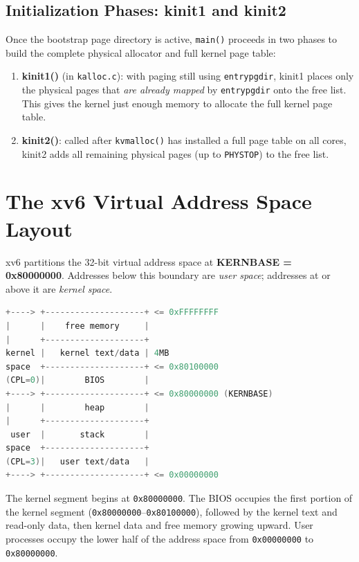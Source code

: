 \documentclass[11pt]{article}
\begin{document}
\subsection{Initialization Phases: kinit1 and kinit2}

Once the bootstrap page directory is active, \texttt{main()} proceeds in two phases to build the complete physical allocator and full kernel page table:

\begin{enumerate}
    \item \textbf{kinit1()} (in \texttt{kalloc.c}): with paging still using \texttt{entrypgdir}, kinit1 places only the physical pages that \emph{are already mapped} by \texttt{entrypgdir} onto the free list. This gives the kernel just enough memory to allocate the full kernel page table.
    \item \textbf{kinit2()}: called after \texttt{kvmalloc()} has installed a full page table on all cores, kinit2 adds all remaining physical pages (up to \texttt{PHYSTOP}) to the free list.
\end{enumerate}

\section{The xv6 Virtual Address Space Layout}

xv6 partitions the 32-bit virtual address space at \textbf{KERNBASE = 0x80000000}. Addresses below this boundary are \emph{user space}; addresses at or above it are \emph{kernel space}.

\begin{lstlisting}[language=C, caption={xv6 virtual address space layout}]
+----> +--------------------+ <= 0xFFFFFFFF
|      |    free memory     |
|      +--------------------+
kernel |   kernel text/data | 4MB
space  +--------------------+ <= 0x80100000
(CPL=0)|        BIOS        |
+----> +--------------------+ <= 0x80000000 (KERNBASE)
|      |        heap        |
|      +--------------------+
 user  |       stack        |
space  +--------------------+
(CPL=3)|   user text/data   |
+----> +--------------------+ <= 0x00000000
\end{lstlisting}

The kernel segment begins at \texttt{0x80000000}. The BIOS occupies the first portion of the kernel segment (\texttt{0x80000000}--\texttt{0x80100000}), followed by the kernel text and read-only data, then kernel data and free memory growing upward. User processes occupy the lower half of the address space from \texttt{0x00000000} to \texttt{0x80000000}.
\end{document}
